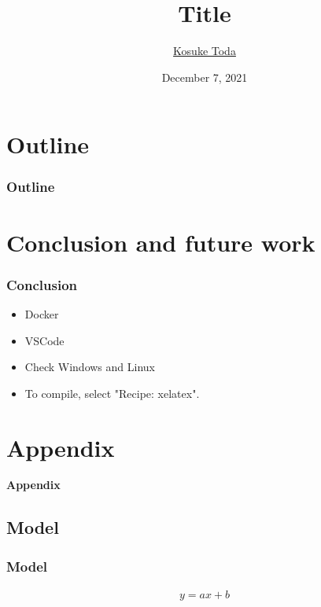 \documentclass[aspectratio=169, unicode, 14pt]{beamer}
\title[short title]{Title}
\author{\underline{Kosuke Toda}} %
\institute[]
{
Graduate School of Engineering Science, Osaka University
}
\date{December 7, 2021} %
\begin{document}
\begin{frame}
\frametitle{}
\titlepage
\end{frame}


\section*{Outline}
\begin{frame}[t]\frametitle{Outline}
\tableofcontents
\end{frame}

\section{Conclusion and future work}
\begin{frame}[t]\frametitle{Conclusion}
  \begin{itemize}
    \item Docker
    \item VSCode
    \item Check Windows and Linux
    \item To compile, select "Recipe: xelatex". 
  \end{itemize}
\end{frame}

\backupbegin

\section*{Appendix}
\begin{frame}
  \textbf{\LARGE{Appendix}}
\end{frame}

\subsection*{Model}
\begin{frame}[t]\frametitle{Model}
  \begin{align}
  y = ax + b \nonumber
  \end{align}
\end{frame}


\backupend
\end{document}
